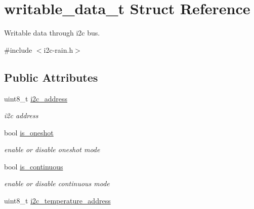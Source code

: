 \hypertarget{structwritable__data__t}{}\section{writable\+\_\+data\+\_\+t Struct Reference}
\label{structwritable__data__t}


Writable data through i2c bus.  




{\ttfamily \#include $<$i2c-\/rain.\+h$>$}

\subsection*{Public Attributes}
\begin{DoxyCompactItemize}
\item 
\mbox{\label{structwritable__data__t_a539304e9f0f30b03691af8b1e8cb6a16}} 
uint8\+\_\+t \hyperlink{structwritable__data__t_a539304e9f0f30b03691af8b1e8cb6a16}{i2c\+\_\+address}
\begin{DoxyCompactList}\small\item\em i2c address \end{DoxyCompactList}\item 
\mbox{\label{structwritable__data__t_afc3c86659df5f3a0840313702c7f66fe}} 
bool \hyperlink{structwritable__data__t_afc3c86659df5f3a0840313702c7f66fe}{is\+\_\+oneshot}
\begin{DoxyCompactList}\small\item\em enable or disable oneshot mode \end{DoxyCompactList}\item 
\mbox{\label{structwritable__data__t_a9c3b7927d969d6f21fe475fd3d67f485}} 
bool \hyperlink{structwritable__data__t_a9c3b7927d969d6f21fe475fd3d67f485}{is\+\_\+continuous}
\begin{DoxyCompactList}\small\item\em enable or disable continuous mode \end{DoxyCompactList}\item 
\mbox{\label{structwritable__data__t_ad1852e6418870b503cc307a106aff52e}} 
uint8\+\_\+t \hyperlink{structwritable__data__t_ad1852e6418870b503cc307a106aff52e}{i2c\+\_\+temperature\+\_\+address}

\end{DoxyCompactItemize}
